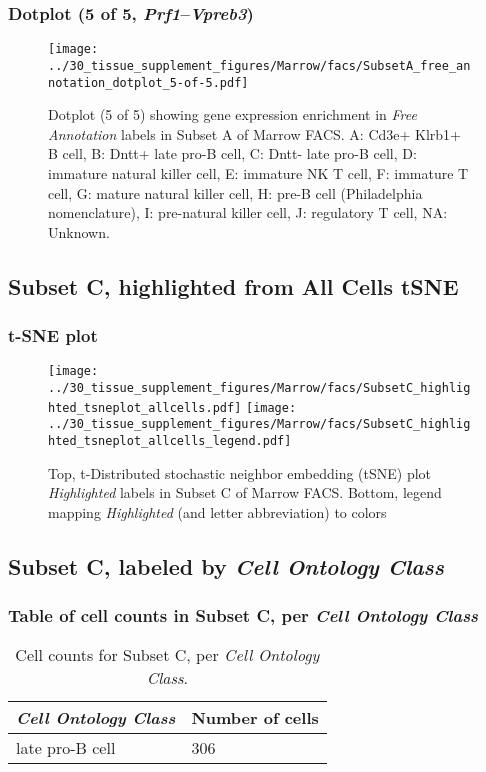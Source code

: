 \clearpage

\subsubsection{Dotplot (5 of 5, \emph{Prf1}--\emph{Vpreb3})}
\begin{figure}[h]
\centering
\texttt{[image: ../30\_tissue\_supplement\_figures/Marrow/facs/SubsetA\_free\_annotation\_dotplot\_5-of-5.pdf]}

\caption{ Dotplot (5 of 5)  showing gene expression enrichment in \emph{Free Annotation} labels in Subset A of Marrow FACS. A: Cd3e+ Klrb1+ B cell, B: Dntt+ late pro-B cell, C: Dntt- late pro-B cell, D: immature natural killer cell, E: immature NK T cell, F: immature T cell, G: mature natural killer cell, H: pre-B cell (Philadelphia nomenclature), I: pre-natural killer cell, J: regulatory T cell, NA: Unknown.}
\end{figure}


\clearpage
\subsection{Subset C, highlighted from All Cells tSNE}
\subsubsection{t-SNE plot}
\begin{figure}[h]
\centering
\texttt{[image: ../30\_tissue\_supplement\_figures/Marrow/facs/SubsetC\_highlighted\_tsneplot\_allcells.pdf]}
\texttt{[image: ../30\_tissue\_supplement\_figures/Marrow/facs/SubsetC\_highlighted\_tsneplot\_allcells\_legend.pdf]}
\caption{Top, t-Distributed stochastic neighbor embedding (tSNE) plot  \emph{Highlighted} labels in Subset C of Marrow FACS. Bottom, legend mapping \emph{Highlighted} (and letter abbreviation) to colors}
\end{figure}


\clearpage

\subsection{Subset C, labeled by \emph{Cell Ontology Class}}
\subsubsection{Table of cell counts in Subset C, per \emph{Cell Ontology Class}}\begin{table}[h]
\centering
\label{my-label}
\begin{tabular}{@{}ll@{}}
\toprule

\emph{Cell Ontology Class}& Number of cells \\ \midrule
late pro-B cell & 306 \\
\bottomrule
\end{tabular}
\caption{Cell counts for Subset C, per \emph{Cell Ontology Class}.}
\end{table}

